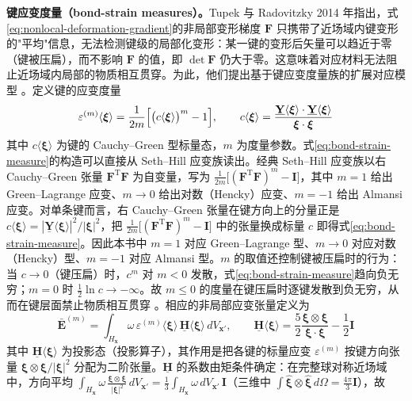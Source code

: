 \textbf{键应变度量（bond-strain measures）。}Tupek 与 Radovitzky 2014 年指出，式\eqref{eq:nonlocal-deformation-gradient}的非局部变形梯度 $\mathbf{F}$ 只携带了近场域内键变形的"平均"信息，无法检测键级的局部化变形：某一键的变形后矢量可以趋近于零（键被压扁），而不影响 $\mathbf{F}$ 的值，即 $\det\mathbf{F}$ 仍大于零。这意味着对应材料无法阻止近场域内局部的物质相互贯穿。为此，他们提出基于键应变度量族的扩展对应模型 \cite{TupekRadovitzky2014}。定义键的应变度量
\begin{equation}
  \varepsilon^{(m)}\langle\boldsymbol{\xi}\rangle
  =\frac{1}{2m}\Bigl[\bigl(c\langle\boldsymbol{\xi}\rangle\bigr)^{m}-1\Bigr],\qquad
  c\langle\boldsymbol{\xi}\rangle=\frac{\underline{\mathbf{Y}}\langle\boldsymbol{\xi}\rangle\cdot\underline{\mathbf{Y}}\langle\boldsymbol{\xi}\rangle}{\boldsymbol{\xi}\cdot\boldsymbol{\xi}}
  \label{eq:bond-strain-measure}
\end{equation}
其中 $c\langle\boldsymbol{\xi}\rangle$ 为键的 Cauchy–Green 型标量态，$m$ 为度量参数。式\eqref{eq:bond-strain-measure}的构造可以直接从 Seth–Hill 应变族读出。经典 Seth–Hill 应变族以右 Cauchy–Green 张量 $\mathbf{F}^{\mathrm{T}}\mathbf{F}$ 为自变量，写为 $\tfrac{1}{2m}\bigl[(\mathbf{F}^{\mathrm{T}}\mathbf{F})^{m}-\mathbf{I}\bigr]$，其中 $m=1$ 给出 Green–Lagrange 应变、$m\to0$ 给出对数（Hencky）应变、$m=-1$ 给出 Almansi 应变。对单条键而言，右 Cauchy–Green 张量在键方向上的分量正是 $c\langle\boldsymbol{\xi}\rangle=|\underline{\mathbf{Y}}\langle\boldsymbol{\xi}\rangle|^{2}/|\boldsymbol{\xi}|^{2}$，把 $\tfrac{1}{2m}\bigl[(\mathbf{F}^{\mathrm{T}}\mathbf{F})^{m}-\mathbf{I}\bigr]$ 中的张量换成标量 $c$ 即得式\eqref{eq:bond-strain-measure}。因此本书中 $m=1$ 对应 Green–Lagrange 型、$m\to0$ 对应对数（Hencky）型、$m=-1$ 对应 Almansi 型。$m$ 的取值还控制键被压扁时的行为：当 $c\to0$（键压扁）时，$c^{m}$ 对 $m<0$ 发散，式\eqref{eq:bond-strain-measure}趋向负无穷；$m=0$ 时 $\tfrac{1}{2}\ln c\to-\infty$。故 $m\le0$ 的度量在键压扁时逐键发散到负无穷，从而在键层面禁止物质相互贯穿 \cite{TupekRadovitzky2014}。相应的非局部应变张量定义为
\begin{equation}
  \bar{\mathbf{E}}^{(m)}
  =\int_{H_{\mathbf{x}}}\omega\,\varepsilon^{(m)}\langle\boldsymbol{\xi}\rangle\,\underline{\mathbf{H}}\langle\boldsymbol{\xi}\rangle\,dV_{\mathbf{x}'},\qquad
  \underline{\mathbf{H}}\langle\boldsymbol{\xi}\rangle=\frac{5}{2}\frac{\boldsymbol{\xi}\otimes\boldsymbol{\xi}}{\boldsymbol{\xi}\cdot\boldsymbol{\xi}}-\frac{1}{2}\mathbf{I}
  \label{eq:nonlocal-strain-tensor}
\end{equation}
其中 $\underline{\mathbf{H}}\langle\boldsymbol{\xi}\rangle$ 为投影态（投影算子），其作用是把各键的标量应变 $\varepsilon^{(m)}$ 按键方向张量 $\boldsymbol{\xi}\otimes\boldsymbol{\xi}/|\boldsymbol{\xi}|^{2}$ 分配为二阶张量。$\underline{\mathbf{H}}$ 的系数由矩条件确定：在完整球对称近场域中，方向平均 $\int_{H_{\mathbf{x}}}\omega\,\tfrac{\boldsymbol{\xi}\otimes\boldsymbol{\xi}}{|\boldsymbol{\xi}|^{2}}\,dV_{\mathbf{x}'}=\tfrac{1}{3}\int_{H_{\mathbf{x}}}\omega\,dV_{\mathbf{x}'}\,\mathbf{I}$（三维中 $\int\hat{\boldsymbol{\xi}}\otimes\hat{\boldsymbol{\xi}}\,d\Omega=\tfrac{4\pi}{3}\mathbf{I}$），故
